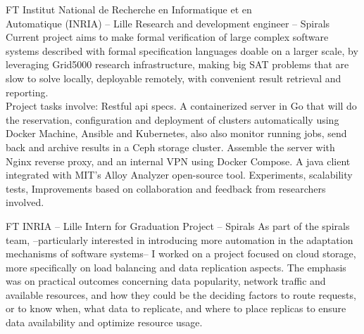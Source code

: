\documentclass[10pt]{article} %
\begin{document}
\begin{paracol}{2}


{FT} %
{Institut National de Recherche en Informatique et en\\Automatique (INRIA) -- Lille} %
{Research and development engineer -- Spirals} %
{Current project aims to make formal verification of large complex software systems described with formal specification languages doable on a larger scale, by leveraging Grid5000 research infrastructure, making big SAT problems that are slow to solve locally, deployable remotely, with convenient result retrieval and reporting. \\Project tasks involve:\hspace{1mm} Restful api specs.\hspace{1mm} A containerized server in Go that will do the reservation, configuration and deployment of clusters automatically using Docker Machine, Ansible and Kubernetes, also also monitor running jobs, send back and archive results in a Ceph storage cluster.\hspace{1mm} Assemble the server with Nginx reverse proxy, and an internal VPN using Docker Compose.\hspace{1mm} A java client integrated with MIT's Alloy Analyzer open-source tool.\hspace{1mm} Experiments, scalability tests, Improvements based on collaboration and feedback from researchers involved.} %


\vspace{-\baselineskip}\medskip %

{FT} %
{INRIA -- Lille} %
{Intern for Graduation Project -- Spirals} %
{As part of the spirals team, --particularly interested in introducing more automation in the adaptation mechanisms of software systems-- I worked on a project focused on cloud storage, more specifically on load balancing and data replication aspects. The emphasis was on practical outcomes concerning data popularity, network traffic and available resources, and how they could be the deciding factors to route requests, or to know when, what data to replicate, and where to place replicas to ensure data availability and optimize resource usage.} %


\end{paracol}
\end{document}
